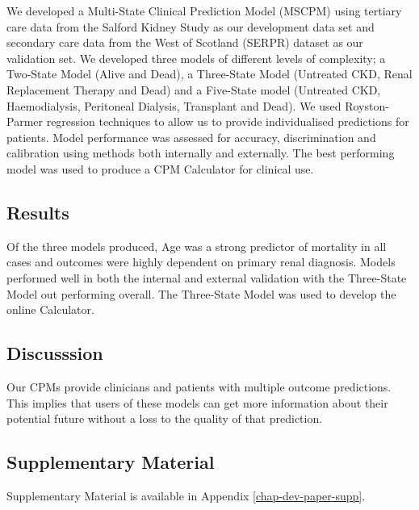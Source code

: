 \documentclass[12pt,PhD,twoside,openright]{muthesis}
\begin{document}
We developed a Multi-State Clinical Prediction Model (MSCPM) using tertiary care data from the Salford Kidney Study as our development data set and secondary care data from the West of Scotland (SERPR) dataset as our validation set. We developed three models of different levels of complexity; a Two-State Model (Alive and Dead), a Three-State Model (Untreated CKD, Renal Replacement Therapy and Dead) and a Five-State model (Untreated CKD, Haemodialysis, Peritoneal Dialysis, Transplant and Dead). We used Royston-Parmer regression techniques to allow us to provide individualised predictions for patients. Model performance was assessed for accuracy, discrimination and calibration using methods both internally and externally. The best performing model was used to produce a CPM Calculator for clinical use.

\hypertarget{results-4}{%
\subsection*{Results}\label{results-4}}

Of the three models produced, Age was a strong predictor of mortality in all cases and outcomes were highly dependent on primary renal diagnosis. Models performed well in both the internal and external validation with the Three-State Model out performing overall. The Three-State Model was used to develop the online Calculator.

\hypertarget{discusssion}{%
\subsection*{Discusssion}\label{discusssion}}

Our CPMs provide clinicians and patients with multiple outcome predictions. This implies that users of these models can get more information about their potential future without a loss to the quality of that prediction.

\hypertarget{supplementary-material-2}{%
\subsection*{Supplementary Material}\label{supplementary-material-2}}

Supplementary Material is available in Appendix \ref{chap-dev-paper-supp}.
\end{document}
